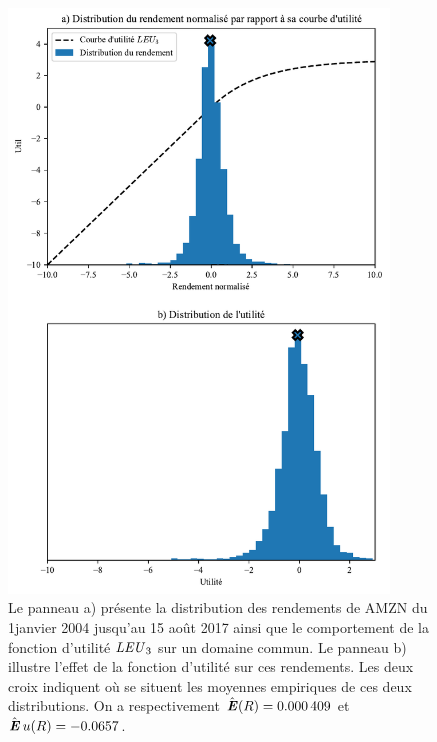 \begin{figure}
  \centering
  \includegraphics[width=0.9\textwidth]{../experiments/fig/corr2.pdf}
  \caption[Distribution des rendements et de l'utilité]{Le panneau a) présente la
    distribution des rendements de AMZN du 1\ier janvier 2004 jusqu'au 15 août 2017 ainsi
    que le comportement de la fonction d'utilité $\mbox{\textit{LEU}}_3$ sur un domaine commun. Le
    panneau b) illustre l'effet de la fonction d'utilité sur ces rendements. Les deux
    croix indiquent où se situent les moyennes empiriques de ces deux distributions. On a
    respectivement $\operatorname{\hat{\operatorname{\mbox{\textbf{\textit{E}}}}}}(R) = \num{0.000409}$ et $\operatorname{\hat{\operatorname{\mbox{\textbf{\textit{E}}}}}} u(R) = \num{-0.0657}$.}
  \label{fig_corr2}
\end{figure}

